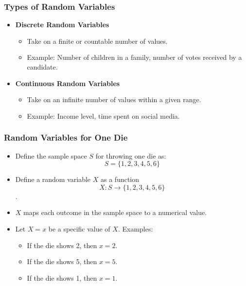 \documentclass[handout]{beamer} %
\begin{document}
\begin{frame}
    \frametitle{Types of Random Variables}
    \begin{itemize}
        \item \textbf{Discrete Random Variables} \pause
        \begin{itemize}
            \item Take on a finite or countable number of values. \pause
            \item Example: Number of children in a family, number of votes received by a candidate. \pause
        \end{itemize}
        \item \textbf{Continuous Random Variables} \pause
        \begin{itemize}
            \item Take on an infinite number of values within a given range. \pause
            \item Example: Income level, time spent on social media. \pause
        \end{itemize}
    \end{itemize}
\end{frame}

\begin{frame}
    \frametitle{Random Variables for One Die}
    \begin{itemize}
        \item Define the sample space \( S \) for throwing one die as: \pause
        \[
        S = \{1, 2, 3, 4, 5, 6\}
        \]  \pause \vspace{-1.5em}
        \item Define a random variable \( X \) as a function 
            \[ X: S \rightarrow \{1, 2, 3, 4, 5, 6\} \]. \pause \vspace{-1.5em}
        \item \( X \) maps each outcome in the sample space to a numerical value. \pause
        \item Let $X=x$ be a specific value of $X$. Examples: \pause
        \begin{itemize}
            \item If the die shows 2, then \( x = 2 \). \pause
            \item If the die shows 5, then \( x = 5 \). \pause
            \item If the die shows 1, then \( x = 1 \). \pause
        \end{itemize}
    \end{itemize}
\end{frame}
\end{document}
